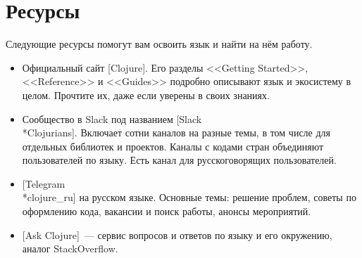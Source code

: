 \section*{Ресурсы}

Следующие ресурсы помогут вам освоить язык и найти на нём работу.

\begin{itemize}

\item
  Официальный сайт [Clojure]. Его
  разделы <<Getting Started>>, <<Reference>> и <<Guides>> подробно описывают
  язык и экосистему в целом. Прочтите их, даже если уверены в своих знаниях.

\item
  Сообщество в Slack под названием
  [Slack\\*Clo\-ju\-ri\-ans].
  Включает сотни каналов на разные темы, в том числе для отдельных библиотек и
  проектов. Каналы с кодами стран объединяют пользователей по языку. Есть канал
   для русскоговорящих пользователей.

\item
  [Telegram\\*cloju\-re\_ru]
  на русском языке. Основные темы: решение проблем, советы по
  оформлению кода, вакансии и поиск работы, анонсы мероприятий.

\item
  [Ask Clojure]~---
  сервис вопросов и ответов по языку и его окружению, аналог
  StackOverflow.

\end{itemize}
